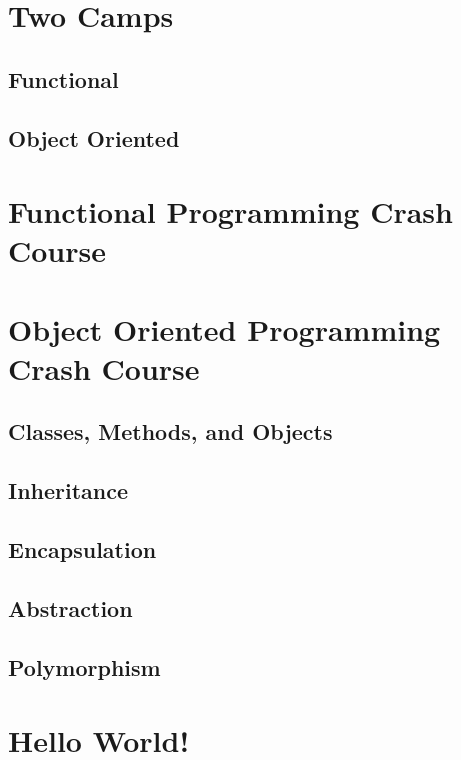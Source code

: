 \documentclass[12pt,a4paper]{book}
\begin{document}
	\chapter{Two Camps}  \label{chap:intro-functional-oops}
		\section{Functional}
		\section{Object Oriented}
			
	\chapter{Functional Programming Crash Course} \label{chap:crash-functional}
	\chapter{Object Oriented Programming Crash Course} \label{chap:oops}
		\section{Classes, Methods, and Objects}
			
		\section{Inheritance}
			
		\section{Encapsulation}
			
		\section{Abstraction}
			
		\section{Polymorphism}
		
	\chapter{Hello World!} \label{chap:hello-world}
\end{document}
